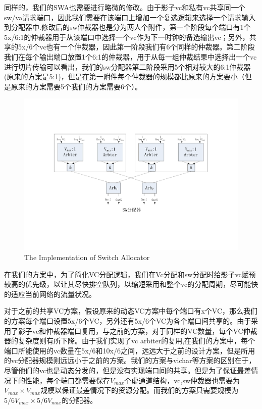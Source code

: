 ﻿\documentclass[10pt,journal]{IEEEtran}
\begin{document}
同样的，我们的SWA也需要进行略微的修改。由于影子vc和私有vc共享同一个sw/va请求端口，因此我们需要在该端口上增加一个复选逻辑来选择一个请求输入到分配器中.修改后的sw仲裁器也是分为两人个附件，第一个阶段每个端口有1个5x/6:1的仲裁器用于从该端口中选择一个vc作为下一时钟的备选输出vc；另外，共享的5x/6个vc也有一个仲裁器，因此第一阶段我们有6个同样的仲裁器。第二阶段我们在每个输出端口放置1个6:1的仲裁器，用于从每一组仲裁结果中选择出一个vc进行切片传输可以看出，我们的sw分配器第二阶段采用5个相对较大的6:1仲裁器(原来的方案是5:1)，但是在第一附件每个仲裁器的规模都比原来的方案要小（但是原来的方案需要5个我们的方案需要6个）。
\begin{figure}
\centering\includegraphics[scale=0.5]{figures/swallocator.pdf}
\caption{The Implementation of Switch Allocator}\label{swallocator}
\end{figure}

在我们的方案中，为了简化VC分配逻辑，我们在Vc分配和sw分配时给影子vc赋预较高的优先级，以让其尽快排空队列，以缩短采用和整个vc的分配周期，尽可能快的适应当前网络的流量状况。

对于之前的共享VC方案，假设原来的动态VC方案中每个端口有x个VC，那么我们的方案每个端口设置5x/6个VC，另外还有5x/6个VC为各个端口间共享的。由于采用了影子vc和仲裁器端口复用，与之前的方案，对于同样的VC数量，每个VC仲裁器的复杂度则有所下降。由于我们实现了vc arbiter的复用,在我们的方案中，每个端口所能使用的vc数量在5x/6和10x/6之间，远远大于之前的设计方案，但是所用的vc分配器规模则远远小于之前的方案。我们的方案与vichar等方案的区别在于，尽管他们的vc也是动态分发的，但是没有实现端口间的共享。但是为了保证最差情况下的性能，每个端口都需要保存$V_{max}$个虚通道结构，vc,sw仲裁器也需要为$V_{max} \times V_{max}$规模以保证最差情况下的资源分配。而我们的方案只需要规模为$5/6V_{max}\times 5/6V_{max}$的分配器。
\end{document}
